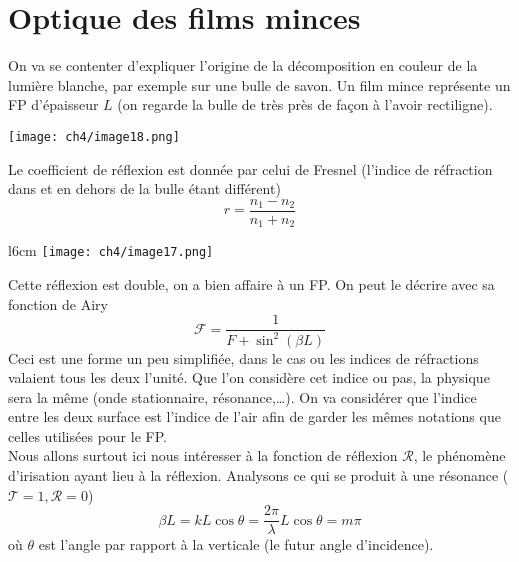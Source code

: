 \newpage
\section{Optique des films minces}
On va se contenter d'expliquer l'origine de la décomposition en couleur de la lumière blanche, 
par exemple sur une bulle de savon. Un film mince représente un FP d'épaisseur $L$ (on regarde 
la bulle de très près de façon à l'avoir rectiligne).

\begin{center}
\vspace{-5mm}
	\texttt{[image: ch4/image18.png]}
\end{center}

Le coefficient de réflexion est donnée par celui de Fresnel (l'indice de réfraction dans et 
en dehors de la bulle étant différent)
\begin{equation}
r = \frac{n_1-n_2}{n_1+n_2}
\end{equation}
	\begin{wrapfigure}[11]{l}{6cm}
	\vspace{-13mm}
	\texttt{[image: ch4/image17.png]}
	\end{wrapfigure}
Cette réflexion est double, on a bien affaire à un FP. On peut le décrire avec sa fonction de 
Airy
\begin{equation}
\mathcal{F} = \dfrac{1}{F+\sin^2(\beta L)}
\end{equation}
Ceci est une forme un peu simplifiée, dans le cas ou les indices de réfractions valaient tous 
les deux l'unité. Que l'on considère cet indice ou pas, la physique sera la même (onde stationnaire, 
résonance,\dots). On va considérer que l'indice entre les deux surface est l'indice de l'air afin 
de garder les mêmes notations que celles utilisées pour le FP.\\

Nous allons surtout ici nous intéresser à la fonction de réflexion $\mathcal{R}$, le phénomène d'irisation 
ayant lieu à la réflexion. Analysons ce qui se produit à une résonance ($\mathcal{T}=1,\mathcal{R}=0$) 
\begin{equation}
\beta L = kL\cos\theta = \frac{2\pi}{\lambda} L\cos\theta = m\pi
\end{equation}
où $\theta$ est l'angle par rapport à la verticale (le futur angle d'incidence).\\

